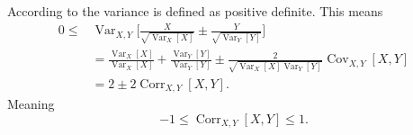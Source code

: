 \begin{example}
	According to  the variance is defined as positive definite. This means
	\begin{equation}
		\label{eq:corr_deriv}
		\begin{split}
			0\leq& \operatorname{Var}_{X,Y}\bigg[\frac{X}{\sqrt{\operatorname{Var}_{X}[X]}}\pm\frac{Y}{\sqrt{\operatorname{Var}_{Y}[Y]}}\bigg]\\
			& = \frac{\operatorname{Var}_X[X]}{\operatorname{Var}_{X}[X]}+\frac{\operatorname{Var}_Y[Y]}{\operatorname{Var}_{Y}[Y]}\pm \frac{2}{\sqrt{\operatorname{Var}_{X}[X]\operatorname{Var}_{Y}[Y]}}\operatorname{Cov}_{X,Y}[X,Y]\\
			& = 2\pm 2\operatorname{Corr}_{X,Y}[X,Y].
		\end{split}
	\end{equation}
	Meaning
	\begin{equation}
		-1\leq \operatorname{Corr}_{X,Y}[X,Y]\leq 1.
	\end{equation}	
\end{example}

